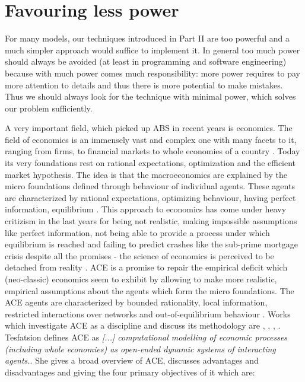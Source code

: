 \chapter{Favouring less power}
For many models, our techniques introduced in Part II are too powerful and a much simpler approach would suffice to implement it. In general too much power should always be avoided (at least in programming and software engineering) because with much power comes much responsibility: more power requires to pay more attention to details and thus there is more potential to make mistakes. Thus we should always look for the technique with minimal power, which solves our problem sufficiently.

A very important field, which picked up ABS in recent years is economics. The field of economics is an immensely vast and complex one with many facets to it, ranging from firms, to financial markets to whole economies of a country \cite{bowles_understanding_2005}. Today its very foundations rest on rational expectations, optimization and the efficient market hypothesis. The idea is that the macroeconomics are explained by the micro foundations \cite{colell_microeconomic_1995} defined through behaviour of individual agents. These agents are characterized by rational expectations, optimizing behaviour, having perfect information, equilibrium \cite{focardi_is_2015}.
This approach to economics has come under heavy critizism in the last years for being not realistic, making impossible assumptions like perfect information, not being able to provide a process under which equilibrium is reached \cite{kirman_complex_2010} and failing to predict crashes like the sub-prime mortgage crisis despite all the promises - the science of economics is perceived to be detached from reality \cite{focardi_is_2015}. 
ACE is a promise to repair the empirical deficit which (neo-classic) economics seem to exhibit by allowing to make more realistic, empirical assumptions about the agents which form the micro foundations. The ACE agents are characterized by bounded rationality, local information, restricted interactions over networks and out-of-equilibrium behaviour \cite{farmer_economy_2009}. 
Works which investigate ACE as a discipline and discuss its methodology are \cite{tesfatsion_agent-based_2002}, \cite{richiardi_agent-based_2007}, \cite{ballot_agent-based_2015}, \cite{blume_introduction_2015}.
Tesfatsion \cite{tesfatsion_agent-based_2017} defines ACE as \textit{[...] computational modelling of economic processes (including whole economies) as open-ended dynamic systems of interacting agents.}. She gives a broad overview \cite{tesfatsion_agent-based_2006} of ACE, discusses advantages and disadvantages and giving the four primary objectives of it which are:


